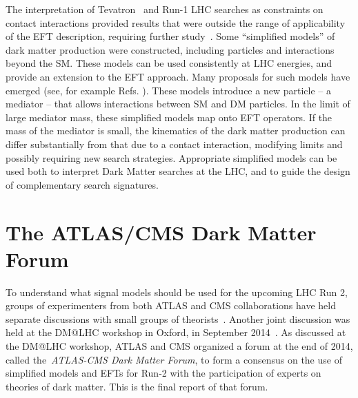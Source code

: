 The interpretation of Tevatron~\cite{Aaltonen:2012jb} and Run-1 LHC searches
as constraints on contact interactions
provided results that were outside the range of applicability of the EFT
description, requiring further study~\cite{Bai:2010hh,Kopp:2011eu,Fox:2011fx,Fox:2011pm,Shoemaker:2011vi,Busoni:2013lha}.
Some ``simplified models'' \cite{Alwall:2008ag,Goodman:2011jq,Alves:2011wf}
of dark matter production were constructed, including particles and interactions beyond the SM.
These models can be used consistently at LHC energies, and provide
an extension to the EFT approach. 
Many proposals for such models have emerged (see, for example
Refs. \cite{An:2012va,An:2012ue,Tait:2013,Buchmueller:2013dya,Bai:2013iqa,Bai:2014osa,An:2013xka,Yavin:14092893,Malik:2014ggr,Harris:2014hga,Buckley:2014fba,Haisch:2015ioa,Bai:2012xg,Carpenter:2012rg,Bell:2012rg,Petrov:2013nia,Carpenter:2013xra}). 
These models introduce a new particle -- a mediator -- that allows
interactions between SM and DM particles.
In the limit of large mediator mass, these simplified models map onto
EFT operators.
If the mass of the mediator is small, the kinematics of the
dark matter production can differ substantially from that due to a contact
interaction, modifying limits and possibly requiring new search strategies.
Appropriate simplified models can be used both to
interpret Dark Matter searches at the LHC, and to guide the design of complementary
search signatures.

\section{The ATLAS/CMS Dark Matter Forum}

To understand what signal models should be used for the upcoming LHC Run 2, groups of experimenters from 
both ATLAS and CMS collaborations have held separate discussions with small groups of
theorists~\cite{Malik:2014ggr,Yavin:14092893}. 
Another joint discussion was held at the DM@LHC workshop in Oxford, in 
September 2014~\cite{DMatLHCProceedings}. 
As discussed at the DM@LHC workshop, ATLAS and CMS organized a forum at the
end of 2014, called the~\textit{ATLAS-CMS Dark
Matter Forum}, to form a consensus on the use of simplified models
and EFTs for Run-2 with the participation of experts on
theories of dark matter. This is the final report of that forum.

